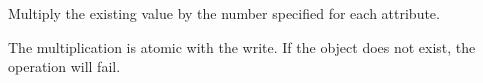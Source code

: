 Multiply the existing value by the number specified for each attribute.

The multiplication is atomic with the write.  If the object does not exist, the
operation will fail.




